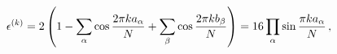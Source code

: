 \begin{equation}
\epsilon^{(k)}=2\left(1-\sum_\alpha \cos {2 \pi k a_\alpha \over N}
+\sum_\beta \cos {2 \pi k b_\beta \over N}\right)=16 \prod_\alpha
\sin {\pi k a_\alpha \over N} \, ,
\label{eigenvalue}
\end{equation}

